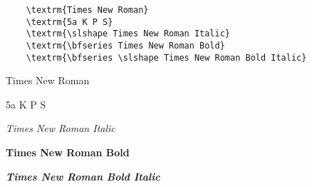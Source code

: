 \documentclass{article}
\begin{document}
\renewcommand\rmdefault{timesnew}

\begin{verbatim}
	\textrm{Times New Roman}
	\textrm{5a K P S}
	\textrm{\slshape Times New Roman Italic}
	\textrm{\bfseries Times New Roman Bold}
	\textrm{\bfseries \slshape Times New Roman Bold Italic}
\end{verbatim}

\textrm{Times New Roman}

\textrm{5a K P S}

\textrm{\slshape Times New Roman Italic}

\textrm{\bfseries Times New Roman Bold}

\textrm{\bfseries \slshape Times New Roman Bold Italic}

%
%
\end{document}
